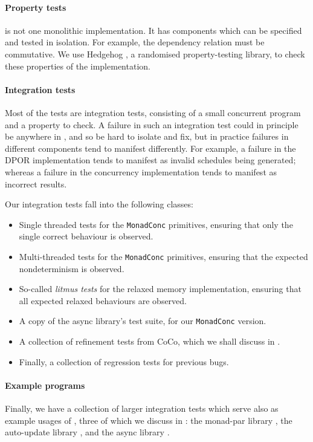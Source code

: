 \paragraph{Property tests}
\dejafu{} is not one monolithic implementation.  It has components
which can be specified and tested in isolation.  For example, the
dependency relation must be commutative.  We use
Hedgehog \parencite{hedgehog}, a randomised property-testing library, to
check these properties of the implementation.

\paragraph{Integration tests}
Most of the tests are integration tests, consisting of a small
concurrent program and a property to check.  A failure in such an
integration test could in principle be anywhere in \dejafu{}, and so
be hard to isolate and fix, but in practice failures in different
components tend to manifest differently.  For example, a failure in
the DPOR implementation tends to manifest as invalid schedules being
generated; whereas a failure in the concurrency implementation tends
to manifest as incorrect results.

Our integration tests fall into the following classes:

\begin{itemize}
\item Single threaded tests for the \verb|MonadConc| primitives,
  ensuring that only the single correct behaviour is observed.
\item Multi-threaded tests for the \verb|MonadConc| primitives,
  ensuring that the expected nondeterminism is observed.
\item So-called \emph{litmus tests} for the relaxed memory
  implementation, ensuring that all expected relaxed behaviours are
  observed.
\item A copy of the async library's \parencite{async} test suite, for our
  \verb|MonadConc| version.
\item A collection of refinement tests from CoCo, which we shall
  discuss in .
\item Finally, a collection of regression tests for previous bugs.
\end{itemize}

\paragraph{Example programs}
Finally, we have a collection of larger integration tests which serve
also as example usages of \dejafu{}, three of which we discuss in
: the monad-par library
\parencite{monad_par,marlow2011}, the auto-update library
\parencite{auto_update}, and the async library \parencite{async}.

